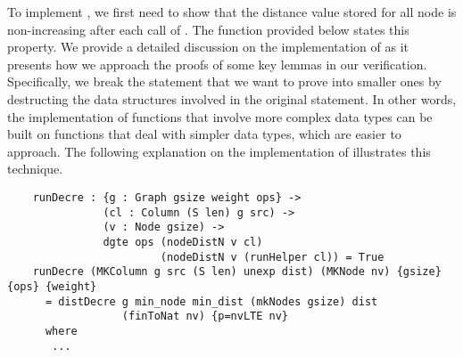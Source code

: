 To implement , we first need to show that the distance value stored for all node is non-increasing after each call of . The function  provided below states this property. We provide a detailed discussion on the implementation of  as it presents how we approach the proofs of some key lemmas in our verification. Specifically, we break the statement that we want to prove into smaller ones by destructing the data structures involved in the original statement. In other words, the implementation of functions that involve more complex data types can be built on functions that deal with simpler data types, which are easier to approach. The following explanation on the implementation of  illustrates this technique. 
\begin{lstlisting}
	runDecre : {g : Graph gsize weight ops} ->
	           (cl : Column (S len) g src) ->
	           (v : Node gsize) ->
	           dgte ops (nodeDistN v cl) 
	           			(nodeDistN v (runHelper cl)) = True
	runDecre (MKColumn g src (S len) unexp dist) (MKNode nv) {gsize} {ops} {weight}
	  = distDecre g min_node min_dist (mkNodes gsize) dist 
	  			  (finToNat nv) {p=nvLTE nv}
	  where
	   ...
\end{lstlisting}

